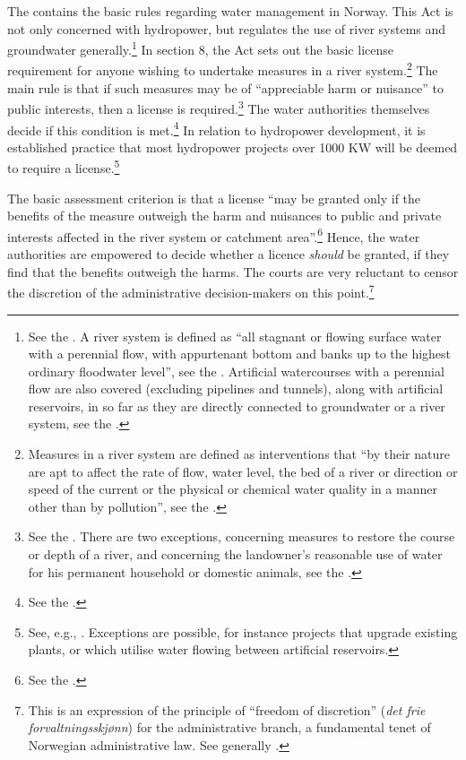The \cite{wra00} contains the basic rules regarding water management in Norway. This Act is not only concerned with hydropower, but regulates the use of river systems and groundwater generally.\footnote{See the \dni\cite[1]{wra00}. A river system is defined as ``all stagnant or flowing surface water with a perennial flow, with appurtenant bottom and banks up to the highest ordinary floodwater level'', see the \dni\cite[2]{wra00}. Artificial watercourses with a perennial flow are also covered (excluding pipelines and tunnels), along with artificial reservoirs, in so far as they are directly connected to groundwater or a river system, see the \dni\cite[2a, 2b]{wra00}.} In section 8, the Act sets out the basic license requirement for anyone wishing to undertake measures in a river system.\footnote{Measures in a river system are defined as interventions that ``by their nature are apt to affect the rate of flow, water level, the bed of a river or direction or speed of the current or the physical or chemical water quality in a manner other than by pollution'', see the \dni\cite[3a]{wra00}.} The main rule is that if such measures may be of ``appreciable harm or nuisance''  to public interests, then a license is required.\footnote{See the \dni\cite[8]{wra00}. There are two exceptions, concerning measures to restore the course or depth of a river, and concerning the landowner's reasonable use of water for his permanent household or domestic animals, see the \dni\cite[12|15]{wra00}.} The water authorities themselves decide if this condition is met.\footnote{See the \dni\cite[18]{wra00}.} In relation to hydropower development, it is established practice that most hydropower projects over 1000 KW will be deemed to require a license.\footnote{See, e.g., \cite{nve09}. Exceptions are possible, for instance projects that upgrade existing plants, or which utilise water flowing between artificial reservoirs.}

The basic assessment criterion is that a license ``may be granted only if the benefits of the measure outweigh the harm and nuisances to public and private interests affected in the river system or catchment area''.\footnote{See the \dni\cite[25]{wra00}.} Hence, the water authorities are empowered to decide whether a licence {\it should} be granted, if they find that the benefits outweigh the harms. The courts are very reluctant to censor the discretion of the administrative decision-makers on this point.\footnote{This is an expression of the principle of ``freedom of discretion'' ({\it det frie forvaltningsskjønn}) for the administrative branch, a fundamental tenet of Norwegian administrative law. See generally \cite[71-74]{eckhoff14}.}

